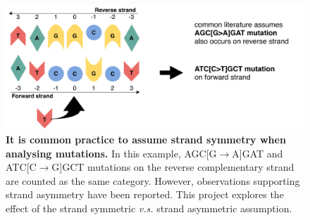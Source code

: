 \begin{figure}[ht!]
    \centering
    \includegraphics[scale=0.78]{graphics/motif_symmetric_demo.pdf}
    \caption{\textbf{It is common practice to assume strand symmetry when analysing mutations.} In this example, AGC[G$\rightarrow$A]GAT and ATC[C$\rightarrow$G]GCT mutations on the reverse complementary strand are counted as the same category. However, observations supporting strand asymmetry have been reported. This project explores the effect of the strand symmetric \textit{v.s.} strand asymmetric assumption.}
    \label{fig:motif_symmetric_demo}
\end{figure}
